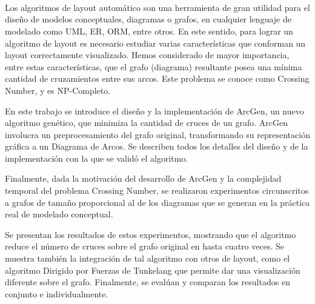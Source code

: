 \ \\
\ \\
\label{pagresum}
\\
\ \\
\ \\

\ \\

\ \\
\ \\
Los algoritmos de layout automático son una herramienta de gran utilidad para el diseño de modelos conceptuales, diagramas o grafos, en cualquier lenguaje de modelado como UML, ER, ORM, entre otros. En este sentido, para lograr un algoritmo de layout es necesario estudiar varias características que conforman un layout correctamente visualizado. Hemos considerado de mayor importancia, entre estas características, que el grafo (diagrama) resultante posea una mínima cantidad de cruzamientos entre sus arcos. Este problema se conoce como Crossing Number, y es NP-Completo. 

En este trabajo se introduce el diseño y la implementación de  {\sc ArcGen}, un nuevo algoritmo genético,  que minimiza la cantidad de cruces de un grafo. {\sc ArcGen} involucra  un preprocesamiento del  grafo  original,  transformando su representación gráfica a un Diagrama de Arcos. Se describen todos los detalles del diseño y de la  implementación con la que se validó el algoritmo.  

Finalmente, dada la  motivación del desarrollo de  {\sc ArcGen} y la complejidad temporal del problema Crossing Number, se realizaron experimentos circunscritos a grafos de tamaño proporcional al de los diagramas que se generan en la práctica real de modelado conceptual. 

Se presentan los resultados de estos experimentos, mostrando que el algoritmo reduce el número de cruces sobre el grafo original en hasta cuatro veces. Se muestra también la integración de tal algoritmo con otros de layout, como el algoritmo Dirigido por Fuerzas de Tunkelang que permite dar una visualización diferente sobre el grafo. Finalmente, se evalúan y comparan los resultados en conjunto e individualmente.

\vfill
\pagebreak
